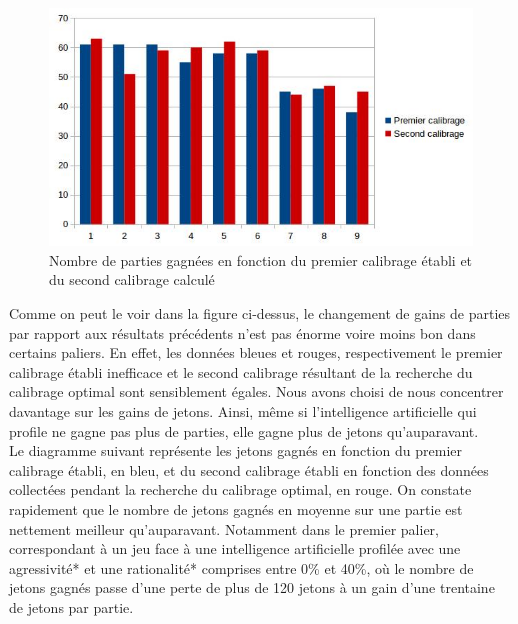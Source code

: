 \documentclass{report}
\begin{document}
\begin{figure}[H]
	\begin{center}
		\includegraphics[scale=0.5]{./imagesRapport/NombrePartiesGagneesEnFonctionCalibrage.jpg}
	\end{center}
	\caption{Nombre de parties gagnées en fonction du premier calibrage établi et du second calibrage calculé}
\end{figure}

Comme on peut le voir dans la figure ci-dessus, le changement de gains de parties par rapport aux résultats précédents n'est pas énorme voire moins bon dans certains paliers. En effet, les données bleues et rouges, respectivement le premier calibrage établi inefficace et le second calibrage résultant de la recherche du calibrage optimal sont sensiblement égales. Nous avons choisi de nous concentrer davantage sur les gains de jetons. Ainsi, même si l'intelligence artificielle qui profile ne gagne pas plus de parties, elle gagne plus de jetons qu’auparavant.\\

Le diagramme suivant représente les jetons gagnés en fonction du premier calibrage établi, en bleu, et du second calibrage établi en fonction des données collectées pendant la recherche du calibrage optimal, en rouge. On constate rapidement que le nombre de jetons gagnés en moyenne sur une partie est nettement meilleur qu'auparavant. Notamment dans le premier palier, correspondant à un jeu face à une intelligence artificielle profilée avec une agressivité* et une rationalité* comprises entre 0\% et 40\%, où le nombre de jetons gagnés passe d'une perte de plus de 120 jetons à un gain d'une trentaine de jetons par partie. \\
\end{document}
